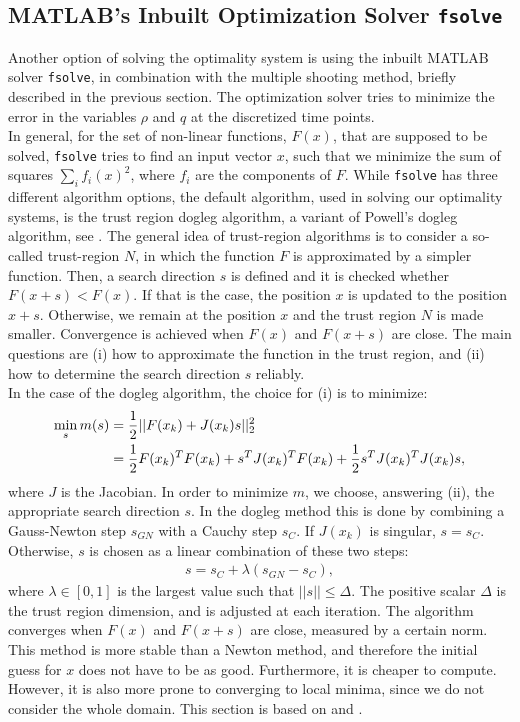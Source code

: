 \documentclass[11pt, a4paper]{article}
\theoremstyle{definition}
\newcommand{\adj}{q}
\begin{document}
\subsection{{\scshape MATLAB}'s Inbuilt Optimization Solver \texttt{fsolve}} \label{sec:fsolvedescription}
Another option of solving the optimality system is using the inbuilt {\scshape MATLAB} solver \texttt{fsolve}, in combination with the multiple shooting method, briefly described in the previous section. The optimization solver tries to minimize the error in the variables $\rho$ and $\adj$ at the discretized time points. 
\\
In general, for the set of non-linear functions, $F(x)$, that are supposed to be solved, \texttt{fsolve} tries to find an input vector $x$, such that we minimize the sum of squares $\sum_i f_i(x)^2$, where $f_i$ are the components of $F$. 
While \texttt{fsolve} has three different algorithm options, the default algorithm, used in solving our optimality systems, is the trust region dogleg algorithm, a variant of Powell's dogleg algorithm, see \cite{Powell1}.   
The general idea of trust-region algorithms is to consider a so-called trust-region $N$, in which the function $F$ is approximated by a simpler function. Then, a search direction $s$ is defined and it is checked whether $F(x+s) < F(x)$. If that is the case, the position $x$ is updated to the position $x+s$. Otherwise, we remain at the position $x$ and the trust region $N$ is made smaller. Convergence is achieved when $F(x)$ and $F(x+s)$ are close.
The main questions are (i) how to approximate the function in the trust region, and (ii) how to determine the search direction $s$ reliably.\\
In the case of the dogleg algorithm, the choice for (i) is to minimize:
\begin{align}
\label{eqn:trustregionsubprob1}
\min_s m(s) &= \frac{1}{2}|| F(x_k) + J(x_k)s||_2^2 \\
&= \frac{1}{2}F(x_k)^T F(x_k) + s^T J(x_k)^T F(x_k) + \frac{1}{2}s^T J(x_k)^TJ(x_k)s, \notag
\end{align}
where $J$ is the Jacobian.
In order to minimize $m$, we choose, answering (ii), the appropriate search direction $s$. In the dogleg method this is done by combining a Gauss-Newton step $s_{GN}$ with a Cauchy step $s_C$.
If $J(x_k)$ is singular, $s = s_C$. Otherwise, $s$ is chosen as a linear combination of these two steps:
\begin{align*}
s = s_C + \lambda(s_{GN} - s_C),
\end{align*}
where $\lambda \in [0,1]$ is the largest value such that $||s|| \leq \Delta$. The positive scalar $\Delta$ is the trust region dimension, and is adjusted at each iteration. The algorithm converges when $F(x)$ and $F(x+s)$ are close, measured by a certain norm. 
This method is more stable than a Newton method, and therefore the initial guess for $x$ does not have to be as good. Furthermore, it is cheaper to compute. However, it is also more prone to converging to local minima, since we do not consider the whole domain.
This section is based on \cite{Powell1} and \cite{fsolve1}.
\end{document}
